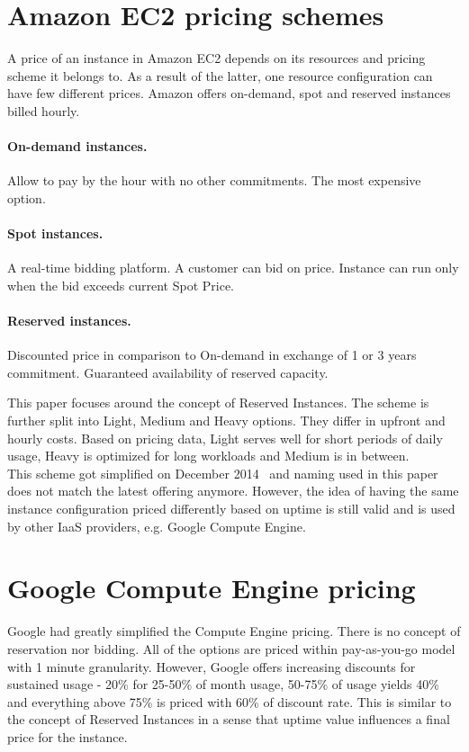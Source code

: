 \documentclass[]{final_report}
\begin{document}
\section{Amazon EC2 pricing schemes}

A price of an instance in Amazon EC2 depends on its resources and pricing scheme it belongs to. As a result of the latter, one resource configuration can have few different prices. Amazon offers on-demand, spot and reserved instances billed hourly.

\paragraph{On-demand instances.} Allow to pay by the hour with no other commitments. The most expensive option.
\paragraph{Spot instances.} A real-time bidding platform. A customer can bid on price. Instance can run only when the bid exceeds current Spot Price.
\paragraph{Reserved instances.} Discounted price in comparison to On-demand in exchange of 1 or 3 years commitment. Guaranteed availability of reserved capacity. 

This paper focuses around the concept of Reserved Instances. The scheme is further split into Light, Medium and Heavy options. They differ in upfront and hourly costs. Based on pricing data, Light serves well for short periods of daily usage, Heavy is optimized for long workloads and Medium is in between. \\
This scheme got simplified on December 2014~\cite{AWS:pricing_change} and naming used in this paper does not match the latest offering anymore. However, the idea of having the same instance configuration priced differently based on uptime is still valid and is used by other IaaS providers, e.g. Google Compute Engine.

\section{Google Compute Engine pricing}

Google had greatly simplified the Compute Engine pricing. There is no concept of reservation nor bidding. All of the options are priced within pay-as-you-go model with 1 minute granularity. However, Google offers increasing discounts for sustained usage - 20\% for 25-50\% of month usage, 50-75\% of usage yields 40\% and everything above 75\% is priced with 60\% of discount rate. This is similar to the concept of Reserved Instances in a sense that uptime value influences a final price for the instance.
\end{document}
